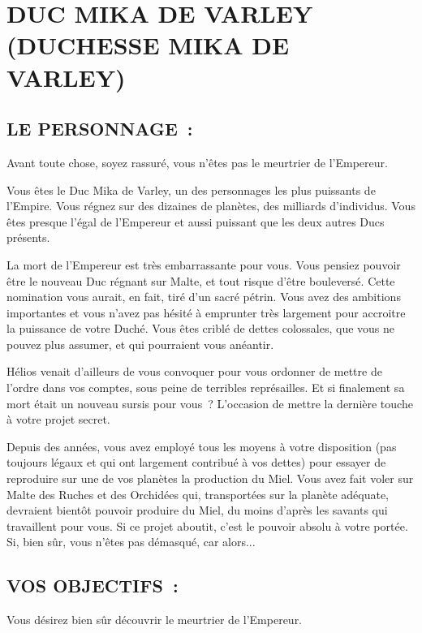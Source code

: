 \documentclass[14pt,twocolumn]{extarticle}
\begin{document}
\section{DUC MIKA DE VARLEY\\(DUCHESSE MIKA DE VARLEY)}

\subsection{LE PERSONNAGE~:}

Avant toute chose, soyez rassuré, vous n'êtes pas le meurtrier de l'Empereur.

Vous êtes le Duc Mika de Varley, un des personnages les plus puissants de
l'Empire. Vous régnez sur des dizaines de planètes, des milliards d'individus.
Vous êtes presque l'égal de l'Empereur et aussi puissant que les deux autres
Ducs présents.

La mort de l'Empereur est très embarrassante pour vous. Vous pensiez pouvoir
être le nouveau Duc régnant sur Malte, et tout risque d'être bouleversé. Cette
nomination vous aurait, en fait, tiré d'un sacré pétrin. Vous avez des
ambitions importantes et vous n'avez pas hésité à emprunter très largement pour
accroitre la puissance de votre Duché. Vous êtes criblé de dettes colossales,
que vous ne pouvez plus assumer, et qui pourraient vous anéantir.

Hélios venait d'ailleurs de vous convoquer pour vous ordonner de mettre de
l'ordre dans vos comptes, sous peine de terribles représailles. Et si
finalement sa mort était un nouveau sursis pour vous~? L'occasion de mettre la
dernière touche à votre projet secret.

Depuis des années, vous avez employé tous les moyens à votre disposition
(pas toujours légaux et qui ont largement contribué à vos dettes) pour essayer
de reproduire sur une de vos planètes la production du Miel. Vous avez fait
voler sur Malte des Ruches et des Orchidées qui, transportées sur la planète
adéquate, devraient bientôt pouvoir produire du Miel, du moins d'après les
savants qui travaillent pour vous. Si ce projet aboutit, c'est le pouvoir
absolu à votre portée. Si, bien sûr, vous n'êtes pas démasqué, car alors...

\subsection{VOS OBJECTIFS~:}

Vous désirez bien sûr découvrir le meurtrier de l'Empereur.
\end{document}

